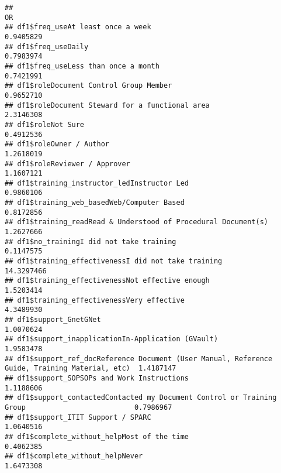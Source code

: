\documentclass[]{article}
\begin{document}
\begin{verbatim}
##                                                                                                      OR
## df1$freq_useAt least once a week                                                              0.9405829
## df1$freq_useDaily                                                                             0.7983974
## df1$freq_useLess than once a month                                                            0.7421991
## df1$roleDocument Control Group Member                                                         0.9652710
## df1$roleDocument Steward for a functional area                                                2.3146308
## df1$roleNot Sure                                                                              0.4912536
## df1$roleOwner / Author                                                                        1.2618019
## df1$roleReviewer / Approver                                                                   1.1607121
## df1$training_instructor_ledInstructor Led                                                     0.9860106
## df1$training_web_basedWeb/Computer Based                                                      0.8172856
## df1$training_readRead & Understood of Procedural Document(s)                                  1.2627666
## df1$no_trainingI did not take training                                                        0.1147575
## df1$training_effectivenessI did not take training                                            14.3297466
## df1$training_effectivenessNot effective enough                                                1.5203414
## df1$training_effectivenessVery effective                                                      4.3489930
## df1$support_GnetGNet                                                                          1.0070624
## df1$support_inapplicationIn-Application (GVault)                                              1.9583478
## df1$support_ref_docReference Document (User Manual, Reference Guide, Training Material, etc)  1.4187147
## df1$support_SOPSOPs and Work Instructions                                                     1.1188606
## df1$support_contactedContacted my Document Control or Training Group                          0.7986967
## df1$support_ITIT Support / SPARC                                                              1.0640516
## df1$complete_without_helpMost of the time                                                     0.4062385
## df1$complete_without_helpNever                                                                1.6473308

\end{verbatim}
\end{document}
